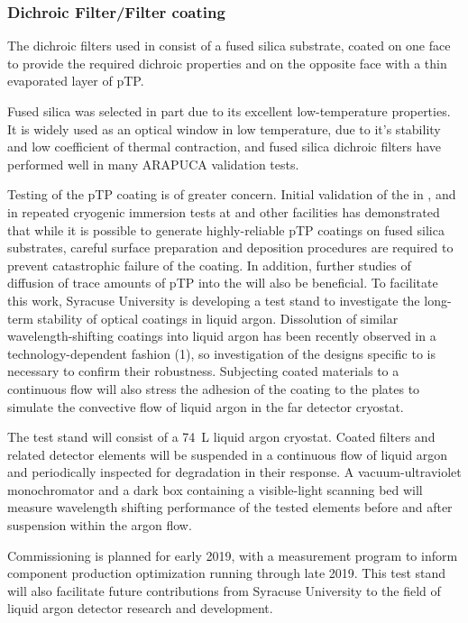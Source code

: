 \subsubsection{Dichroic Filter/Filter coating}

The dichroic filters used in  consist of a fused silica substrate, coated on one face to provide the required dichroic properties and on the opposite face with a thin evaporated layer of pTP.

Fused silica was selected in part due to its excellent low-temperature properties.  It is widely used as an optical window in low temperature, due to it's stability and low coefficient of thermal contraction, and fused silica dichroic filters have performed well in many ARAPUCA validation tests.

Testing of the pTP coating is of greater concern.  Initial validation of the  in ,  and in repeated cryogenic immersion tests at  and other facilities has demonstrated that while it is possible to generate highly-reliable pTP coatings on fused silica substrates, careful surface preparation and deposition procedures are required to prevent catastrophic failure of the coating.  In addition, further studies of diffusion of trace amounts of pTP into the  will also be beneficial.  To facilitate this work,  Syracuse University is developing a test stand to investigate the long-term stability of  optical coatings in liquid argon. Dissolution of similar wavelength-shifting coatings into liquid argon has been recently observed in a technology-dependent fashion (1), so investigation of the designs specific to  is necessary to confirm their robustness. Subjecting coated materials to a continuous flow will also stress the adhesion of the coating to the plates to simulate the convective flow of liquid argon in the far detector cryostat.

The test stand will consist of a \SI{74}{L} liquid argon cryostat. Coated filters and related detector elements will be suspended in a continuous flow of liquid argon and periodically inspected for degradation in their response. A vacuum-ultraviolet monochromator and a dark box containing a visible-light scanning bed will measure wavelength shifting performance of the tested elements before and after suspension within the argon flow.


Commissioning is planned for early 2019, with a measurement program to inform component production optimization running through late 2019. This test stand will also facilitate future contributions from Syracuse University to the field of liquid argon detector research and development.

